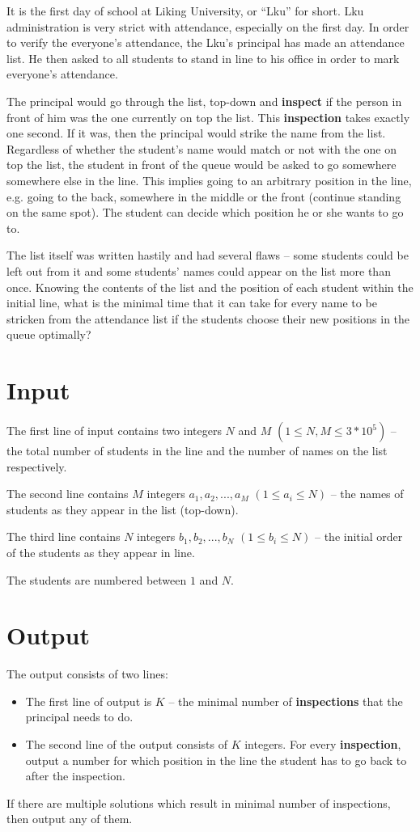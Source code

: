It is the first day of school at Liking University, or ``Lku'' for short.
Lku administration is very strict with attendance, especially on the first day.
In order to verify the everyone's attendance, the Lku's principal has made an attendance list.
He then asked to all students to stand in line to his office in order to mark everyone's attendance.

The principal would go through the list, top-down and \textbf{inspect} if the person in front of him was the one currently on top the list.
This \textbf{inspection} takes exactly one second.
If it was, then the principal would strike the name from the list.
Regardless of whether the student's name would match or not with the one on top the list, the student in front of the queue would be asked to go somewhere somewhere else in the line.
This implies going to an arbitrary position in the line, e.g. going to the back, somewhere in the middle or the front (continue standing on the same spot).
The student can decide which position he or she wants to go to.

The list itself was written hastily and had several flaws -- some students could be left out from it and some students' names could appear on the list more than once.
Knowing the contents of the list and the position of each student within the initial line, what is the minimal time that it can take for every name to be stricken from the attendance list if the students choose their new positions in the queue optimally?

\section*{Input}
The first line of input contains two integers $N$ and $M$ $(1 \leq N, M \leq 3*10^5)$ -- the total number of students in the line and the number of names on the list respectively.

The second line contains $M$ integers $a_1, a_2, ... , a_M$ $(1 \leq a_i \leq N)$ -- the names of students as they appear in the list (top-down).

The third line contains $N$ integers $b_1, b_2, ... , b_N$ $(1 \leq b_i \leq N)$ -- the initial order of the students as they appear in line.

The students are numbered between $1$ and $N$.

\section*{Output}
The output consists of two lines:

\begin{itemize}
\item The first line of output is $K$ -- the minimal number of \textbf{inspections} that the principal needs to do.
\item The second line of the output consists of $K$ integers. For every \textbf{inspection}, output a number for which position in the line the student has to go back to after the inspection.
\end{itemize}

If there are multiple solutions which result in minimal number of inspections, then output any of them.

